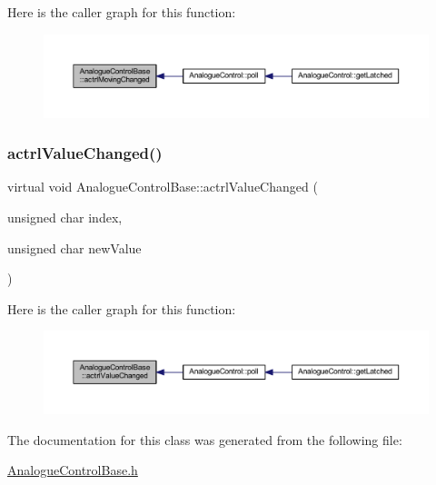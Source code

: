 Here is the caller graph for this function\+:
\nopagebreak
\begin{figure}[H]
\begin{center}
\leavevmode
\includegraphics[width=350pt]{class_analogue_control_base_ab680f6fd45ec093200d3d78744957c1b_icgraph}
\end{center}
\end{figure}
\mbox{\label{class_analogue_control_base_a9d18c3e299a69c909a3ad88b70524c5d}} 
\subsubsection{\texorpdfstring{actrl\+Value\+Changed()}{actrlValueChanged()}}
{\footnotesize\ttfamily virtual void Analogue\+Control\+Base\+::actrl\+Value\+Changed (\begin{DoxyParamCaption}\item[{unsigned char}]{index,  }\item[{unsigned char}]{new\+Value }\end{DoxyParamCaption})\hspace{0.3cm}{\ttfamily [pure virtual]}}

Here is the caller graph for this function\+:
\nopagebreak
\begin{figure}[H]
\begin{center}
\leavevmode
\includegraphics[width=350pt]{class_analogue_control_base_a9d18c3e299a69c909a3ad88b70524c5d_icgraph}
\end{center}
\end{figure}


The documentation for this class was generated from the following file\+:\begin{DoxyCompactItemize}
\item 
\hyperlink{_analogue_control_base_8h}{Analogue\+Control\+Base.\+h}\end{DoxyCompactItemize}
